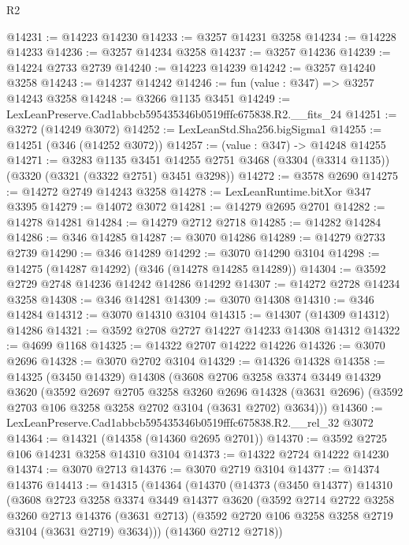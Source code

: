 \begin{lexlean}{R2}
\begin{coremodule}
@14231 := @14223 @14230
@14233 := @3257 @14231 @3258
@14234 := @14228 @14233
@14236 := @3257 @14234 @3258
@14237 := @3257 @14236
@14239 := @14224 @2733 @2739
@14240 := @14223 @14239
@14242 := @3257 @14240 @3258
@14243 := @14237 @14242
@14246 := fun (value : @347) => @3257 @14243 @3258
@14248 := @3266 @1135 @3451
@14249 := LexLeanPreserve.Cad1abbcb595435346b0519fffc675838.R2.__fits_24
@14251 := @3272 (@14249 @3072)
@14252 := LexLeanStd.Sha256.bigSigma1
@14255 := @14251 (@346 (@14252 @3072))
@14257 := (value : @347) -> @14248 @14255
@14271 := @3283
    @1135
    @3451
    @14255
    @2751
    @3468
    (@3304 (@3314 @1135))
    (@3320 (@3321 (@3322 @2751) @3451 @3298))
@14272 := @3578 @2690
@14275 := @14272 @2749 @14243 @3258
@14278 := LexLeanRuntime.bitXor @347 @3395
@14279 := @14072 @3072
@14281 := @14279 @2695 @2701
@14282 := @14278 @14281
@14284 := @14279 @2712 @2718
@14285 := @14282 @14284
@14286 := @346 @14285
@14287 := @3070 @14286
@14289 := @14279 @2733 @2739
@14290 := @346 @14289
@14292 := @3070 @14290 @3104
@14298 := @14275 (@14287 @14292) (@346 (@14278 @14285 @14289))
@14304 := @3592 @2729 @2748 @14236 @14242 @14286 @14292
@14307 := @14272 @2728 @14234 @3258
@14308 := @346 @14281
@14309 := @3070 @14308
@14310 := @346 @14284
@14312 := @3070 @14310 @3104
@14315 := @14307 (@14309 @14312) @14286
@14321 := @3592 @2708 @2727 @14227 @14233 @14308 @14312
@14322 := @4699 @1168
@14325 := @14322 @2707 @14222 @14226
@14326 := @3070 @2696
@14328 := @3070 @2702 @3104
@14329 := @14326 @14328
@14358 := @14325
    (@3450 @14329)
    @14308
    (@3608
      @2706
      @3258
      @3374
      @3449
      @14329
      @3620
      (@3592
        @2697
        @2705
        @3258
        @3260
        @2696
        @14328
        (@3631 @2696)
        (@3592 @2703 @106 @3258 @3258 @2702 @3104 (@3631 @2702) @3634)))
@14360 := LexLeanPreserve.Cad1abbcb595435346b0519fffc675838.R2.__rel_32 @3072
@14364 := @14321 (@14358 (@14360 @2695 @2701))
@14370 := @3592 @2725 @106 @14231 @3258 @14310 @3104
@14373 := @14322 @2724 @14222 @14230
@14374 := @3070 @2713
@14376 := @3070 @2719 @3104
@14377 := @14374 @14376
@14413 := @14315
    (@14364
      (@14370
        (@14373
          (@3450 @14377)
          @14310
          (@3608
            @2723
            @3258
            @3374
            @3449
            @14377
            @3620
            (@3592
              @2714
              @2722
              @3258
              @3260
              @2713
              @14376
              (@3631 @2713)
              (@3592 @2720 @106 @3258 @3258 @2719 @3104 (@3631 @2719) @3634)))
          (@14360 @2712 @2718))

\end{coremodule}
\end{lexlean}
